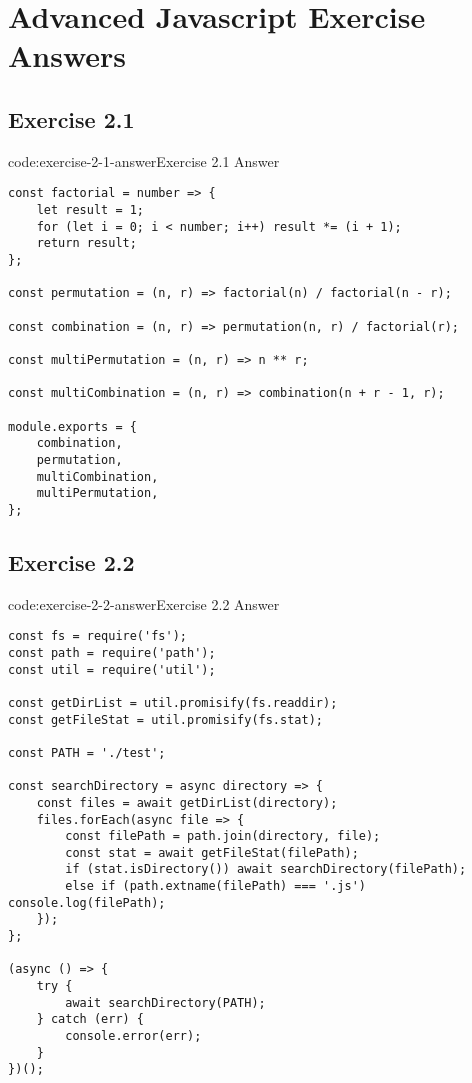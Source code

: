 \section{Advanced Javascript Exercise Answers}\label{sect:advanced-javascript-answers}

\subsection*{Exercise 2.1}

\begin{codeenv}{code:exercise-2-1-answer}{Exercise 2.1 Answer}\begin{verbatim}
const factorial = number => {
    let result = 1;
    for (let i = 0; i < number; i++) result *= (i + 1);
    return result;
};

const permutation = (n, r) => factorial(n) / factorial(n - r);

const combination = (n, r) => permutation(n, r) / factorial(r);

const multiPermutation = (n, r) => n ** r;

const multiCombination = (n, r) => combination(n + r - 1, r);

module.exports = {
    combination,
    permutation,
    multiCombination,
    multiPermutation,
};
\end{verbatim}
\end{codeenv}

\subsection*{Exercise 2.2}

\begin{codeenv}{code:exercise-2-2-answer}{Exercise 2.2 Answer}\begin{verbatim}
const fs = require('fs');
const path = require('path');
const util = require('util');

const getDirList = util.promisify(fs.readdir);
const getFileStat = util.promisify(fs.stat);

const PATH = './test';

const searchDirectory = async directory => {
    const files = await getDirList(directory);
    files.forEach(async file => {
        const filePath = path.join(directory, file);
        const stat = await getFileStat(filePath);
        if (stat.isDirectory()) await searchDirectory(filePath);
        else if (path.extname(filePath) === '.js') console.log(filePath);
    });
};

(async () => {
    try {
        await searchDirectory(PATH);
    } catch (err) {
        console.error(err);
    }
})();
\end{verbatim}
\end{codeenv}
